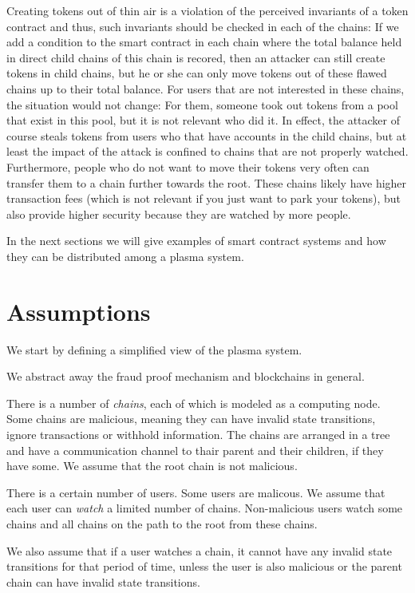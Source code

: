 \documentclass[11pt,letterpaper]{article}
\begin{document}
Creating tokens out of thin air is a violation of the perceived invariants
of a token contract and thus, such invariants should be checked in each of the
chains: If we add a condition to the smart contract in each chain where the total balance
held in direct child chains of this chain is recored, then an attacker can still
create tokens in child chains, but he or she can only move tokens out of these
flawed chains up to their total balance. For users that are not interested
in these chains, the situation would not change: For them, someone took out
tokens from a pool that exist in this pool, but it is not relevant who did it.
In effect, the attacker of course steals tokens from users who that have
accounts in the child chains, but at least the impact of the attack is
confined to chains that are not properly watched. Furthermore, people who do not
want to move their tokens very often can transfer them to a chain further
towards the root. These chains likely have higher transaction fees (which
is not relevant if you just want to park your tokens), but also
provide higher security because they are watched by more people.

In the next sections we will give examples of smart contract systems
and how they can be distributed among a plasma system.

\section{Assumptions}

We start by defining a simplified view of the plasma system.

We abstract away the fraud proof mechanism and blockchains in general.

There is a number of \emph{chains}, each of which is modeled as a
computing node. Some chains are malicious, meaning they can have
invalid state transitions, ignore transactions or withhold information.
The chains are arranged in a tree and have a communication channel
to thair parent and their children, if they have some.
We assume that the root chain is not malicious.

There is a certain number of users. Some users are malicous.
We assume that each user can \emph{watch} a limited number of chains.
Non-malicious users watch some chains and
all chains on the path to the root from these chains.

We also assume that if a user watches a chain,
it cannot have any invalid state transitions for that period of time,
unless the user is also malicious or the parent chain can have
invalid state transitions.
\end{document}

